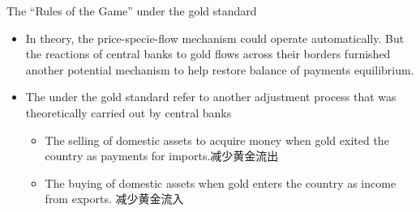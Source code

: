 \documentclass[10pt,hyperref={CJKbookmarks=true},xcolor=dvipsnames,aspectratio=169]{beamer}
\begin{document}
\begin{frame}{The “Rules of the Game” under the gold standard}
\begin{itemize}
	\item In theory, the price-specie-flow mechanism could operate automatically. But the
	reactions of central banks to gold flows across their borders furnished another
	potential mechanism to help restore balance of payments equilibrium. 
	\item The  under the gold standard
	refer to another adjustment process that was
	theoretically carried out by central banks
	\begin{itemize}
		\item The selling of domestic assets to acquire money when gold
		exited the country as payments for imports.减少黄金流出
		\item The buying of domestic assets when gold enters the
		country as income from exports. 减少黄金流入
	\end{itemize}
\end{itemize}
\end{frame}
\end{document}
